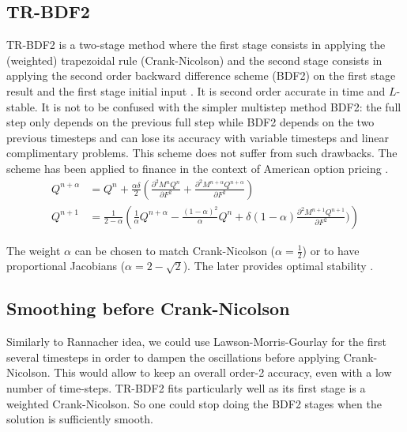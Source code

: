 \documentclass[]{rAMF2e}
\begin{document}
\subsection{TR-BDF2}
TR-BDF2 is a two-stage method where the first stage consists in applying the (weighted) trapezoidal rule (Crank-Nicolson) and the second stage consists in applying the second order backward difference scheme (BDF2) on the first stage result and the first stage initial input \citep{bank1985transient, Le07}. It is second order accurate in time and $L$-stable. It is not to be confused with the simpler multistep method BDF2: the full step only depends on the previous full step while BDF2 depends on the two previous timesteps and can lose its accuracy \citep{windcliff2001shout} with variable timesteps and linear complimentary problems. This scheme does not suffer from such drawbacks. The scheme has been applied to finance in the context of American option pricing \citep{floc2013tr}.
\begin{align}
Q^{n+\alpha} &= Q^n + \frac{\alpha \delta}{2}\left(\frac{\partial^2 M^{n} Q^n}{\partial F^2}+\frac{\partial^2 M^{n+\alpha} Q^{n+\alpha}}{\partial F^2}\right)\\
Q^{n+1} &= \frac{1}{2-\alpha}\left(\frac{1}{\alpha} Q^{n+\alpha} - \frac{(1-\alpha)^2}{\alpha}Q^n + \delta(1-\alpha)\frac{\partial^2 M^{n+1} Q^{n+1}}{\partial F^2})\right)
\end{align}

The weight $\alpha$ can be chosen to match Crank-Nicolson ($\alpha=\frac{1}{2}$) or to have proportional Jacobians ($\alpha = 2-\sqrt{2}$). The later provides optimal stability \citep{dharmaraja2009optimal}. 

\subsection{Smoothing before Crank-Nicolson}
Similarly to Rannacher idea, we could use Lawson-Morris-Gourlay for the first several timesteps in order to dampen the oscillations before applying Crank-Nicolson. This would allow to keep an overall order-2 accuracy, even with a low number of time-steps. TR-BDF2 fits particularly well as its first stage is a weighted Crank-Nicolson. So one could stop doing the BDF2 stages when the solution is sufficiently smooth. 
\end{document}

